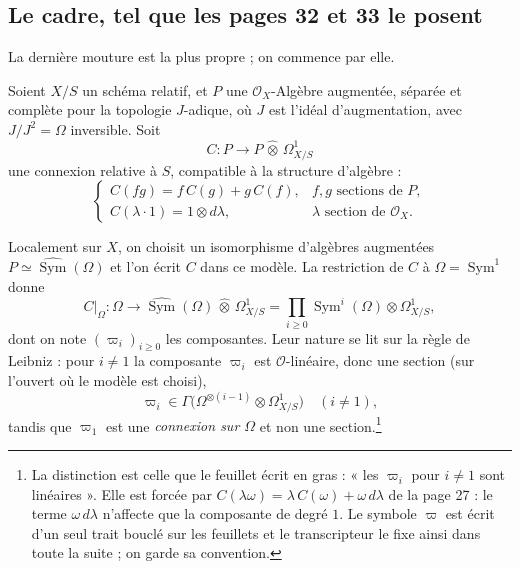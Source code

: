 \documentclass[11pt,a4paper]{article}
\begin{document}
\subsection*{Le cadre, tel que les pages 32 et 33 le posent}

La dernière mouture est la plus propre ; on commence par elle.

Soient $X/S$ un schéma relatif, et $P$ une $\mathcal{O}_X$-Algèbre augmentée,
séparée et complète pour la topologie $J$-adique, où $J$ est l'idéal
d'augmentation, avec $J/J^2 = \Omega$ inversible. Soit
\[
  C : P \longrightarrow P \,\widehat{\otimes}\, \Omega^1_{X/S}
\]
une connexion relative à $S$, compatible à la structure d'algèbre :
\[
  \begin{cases}
    C(fg) = f\,C(g) + g\,C(f), & f,g \text{ sections de } P, \\
    C(\lambda \cdot 1) = 1 \otimes d\lambda, &
    \lambda \text{ section de } \mathcal{O}_X .
  \end{cases}
\]

Localement sur $X$, on choisit un isomorphisme d'algèbres augmentées
$P \simeq \widehat{\operatorname{Sym}}(\Omega)$ et l'on écrit $C$ dans ce
modèle. La restriction de $C$ à $\Omega = \operatorname{Sym}^1$ donne
\[
  C|_\Omega : \Omega \longrightarrow
  \widehat{\operatorname{Sym}}(\Omega) \,\widehat{\otimes}\, \Omega^1_{X/S}
  = \prod_{i \geqslant 0} \operatorname{Sym}^i(\Omega)
  \otimes \Omega^1_{X/S},
\]
dont on note $(\varpi_i)_{i \geqslant 0}$ les composantes. Leur nature se lit
sur la règle de Leibniz : pour $i \neq 1$ la composante $\varpi_i$ est
$\mathcal{O}$-linéaire, donc une section (sur l'ouvert où le modèle est
choisi),
\[
  \varpi_i \in \Gamma\big( \Omega^{\otimes(i-1)} \otimes \Omega^1_{X/S}
  \big) \quad (i \neq 1),
\]
tandis que $\varpi_1$ est une \emph{connexion sur $\Omega$} et non une
section.\footnote{La distinction est celle que le feuillet écrit en gras :
« les $\varpi_i$ pour $i \neq 1$ sont linéaires ». Elle est forcée par
$C(\lambda\omega) = \lambda\,C(\omega) + \omega\,d\lambda$ de la page 27 : le
terme $\omega\,d\lambda$ n'affecte que la composante de degré $1$. Le symbole
$\varpi$ est écrit d'un seul trait bouclé sur les feuillets et le
transcripteur le fixe ainsi dans toute la suite ; on garde sa convention.}
\end{document}
